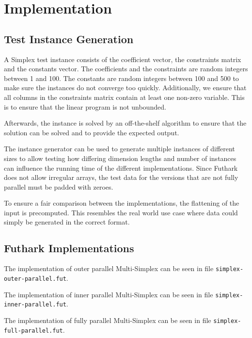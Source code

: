 \section{Implementation}
\subsection{Test Instance Generation}
A Simplex test instance consists of the coefficient vector, the constraints matrix and the constants vector. The coefficients and the constraints are random integers between 1 and 100. The constants are random integers between 100 and 500 to make sure the instances do not converge too quickly. Additionally, we ensure that all columns in the constraints matrix contain at least one non-zero variable. This is to ensure that the linear program is not unbounded.

Afterwards, the instance is solved by an off-the-shelf algorithm to ensure that the solution can be solved and to provide the expected output. 

The instance generator can be used to generate multiple instances of different sizes to allow testing how differing dimension lengths and number of instances can influence the running time of the different implementations. Since Futhark does not allow irregular arrays, the test data for the versions that are not fully parallel must be padded with zeroes.

To ensure a fair comparison between the implementations, the flattening of the input is precomputed. This resembles the real world use case where data could simply be generated in the correct format.

\subsection{Futhark Implementations}
The implementation of outer parallel Multi-Simplex can be seen in file \texttt{simplex-outer-parallel.fut}.

\newpar
The implementation of inner parallel Multi-Simplex can be seen in file \texttt{simplex-inner-parallel.fut}.

\newpar
The implementation of fully parallel Multi-Simplex can be seen in file \texttt{simplex-full-parallel.fut}.
